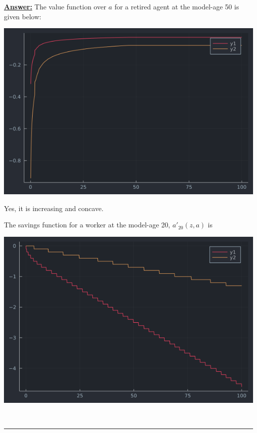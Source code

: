 \documentclass{article} %
\theoremstyle{definition}
\newenvironment{solution}[1][Answer]{\begin{singlespace}\underline{\textbf{#1:}}\quad }{\ \rule{0.3em}{0.3em}\end{singlespace}} %
\begin{document}
	\begin{solution}
		The value function over $ a $ for a retired agent at the model-age 50 is given below:
		\begin{center}
			\includegraphics[width=\linewidth]{../Figures/val_fun50.png}
		\end{center}
		Yes, it is increasing and concave.
		
		The savings function for a worker at the model-age 20, $ a'_{20}(z, a) $ is 
		\begin{center}
			\includegraphics[width=\linewidth]{../Figures/savings20.png}
		\end{center}
	\end{solution}
\end{document}
